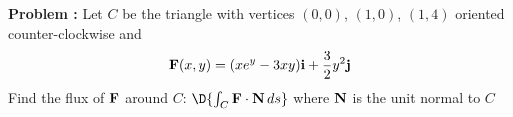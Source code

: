 {\bf Problem :} Let \(C\) be the triangle with vertices \((0,0)\), \((1,0)\), \((1,4)\) oriented counter-clockwise and 
\[{\bf F}(x,y) = (xe^{y}-3xy) {\bf i} + \frac{3}{2}y^2 {\bf j}\]
Find the flux of \({\bf F}\) around \(C\): \(\D{\int_C {\bf F}\cdot {\bf N} \, ds}\) where \({\bf N}\) is the unit normal to \(C\)
